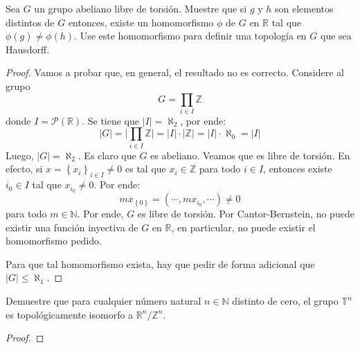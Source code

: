 \documentclass[12pt]{report}
\theoremstyle{largebreak}
\newcommand\abs[1]{\ensuremath{\lvert#1\rvert}}
\begin{document}
    \begin{excer}
        Sea $G$ un grupo abeliano libre de torsión. Muestre que si $g$ y $h$ son elementos distintos de $G$ entonces, existe un homomorfismo $\phi$ de $G$ en $\mathbb{R}$ tal que $\phi(g)\neq\phi(h)$. Use este homomorfismo para definir una topología en $G$ que sea Hausdorff.
    \end{excer}

    \begin{proof}
        Vamos a probar que, en general, el resultado no es correcto. Considere al grupo
        \begin{equation*}
            G=\prod_{ i\in I}\mathbb{Z}
        \end{equation*}
        donde $I=\mathcal{P}\left(\mathbb{R}\right)$. Se tiene que $\abs{I}=\aleph_2$, por ende:
        \begin{equation*}
            \abs{G}=\abs{\prod_{ i\in I}\mathbb{Z}}=\abs{I}\cdot\abs{\mathbb{Z}}=\abs{I}\cdot\aleph_0=\abs{I}
        \end{equation*}
        Luego, $\abs{G}=\aleph_2$. Es claro que $G$ es abeliano. Veamos que es libre de torsión. En efecto, si $x=\left\{x_i \right\}_{ i\in I}\neq0$ es tal que $x_i\in\mathbb{Z}$ para todo $i\in I$, entonces existe $i_0\in I$ tal que $x_{i_0}\neq0$. Por ende:
        \begin{equation*}
            mx_{\left\{0 \right\}}=(\cdots,mx_{i_0},\cdots)\neq0
        \end{equation*}
        para todo $m\in\mathbb{N}$. Por ende, $G$ es libre de torsión. Por Cantor-Bernstein, no puede existir una función inyectiva de $G$ en $\mathbb{R}$, en particular, no puede existir el homomorfismo pedido.

        Para que tal homomorfismo exista, hay que pedir de forma adicional que $\abs{G}\leq\aleph_1$.
    \end{proof}

    \begin{excer}
        Demuestre que para cualquier número natural $n\in\mathbb{N}$ distinto de cero, el grupo $\mathbb{T}^n$ es topológicamente isomorfo a $\mathbb{R}^n/\mathbb{Z}^n$.
    \end{excer}

    \begin{proof}
        
    \end{proof}
\end{document}
